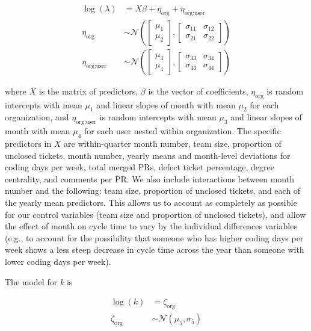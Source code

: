 \documentclass[
  sn-mathphys-ay,
]{sn-jnl}
\begin{document}
\begin{equation}
\begin{aligned}
\log(\lambda) &= X\beta + \eta_{\text{org}} + \eta_{\text{org:user}} \\
\eta_{\text{org}} &\sim \mathcal{N}\left(\begin{bmatrix} \mu_1 \\ \mu_2 \end{bmatrix}, \begin{bmatrix} \sigma_{11} & \sigma_{12} \\ \sigma_{21} & \sigma_{22} \end{bmatrix}\right) \\
\eta_{\text{org:user}} &\sim \mathcal{N}\left(\begin{bmatrix} \mu_3 \\ \mu_4 \end{bmatrix}, \begin{bmatrix} \sigma_{33} & \sigma_{34} \\ \sigma_{43} & \sigma_{44} \end{bmatrix}\right) 
\end{aligned}
\end{equation}

where \(X\) is the matrix of predictors, \(\beta\) is the vector of
coefficients, \(\eta_{\text{org}}\) is random intercepts with mean
\(\mu_1\) and linear slopes of month with mean \(\mu_2\) for each
organization, and \(\eta_{\text{org:user}}\) is random intercepts with
mean \(\mu_3\) and linear slopes of month with mean \(\mu_4\) for each
user nested within organization. The specific predictors in \(X\) are
within-quarter month number, team size, proportion of unclosed tickets,
month number, yearly means and month-level deviations for coding days
per week, total merged PRs, defect ticket percentage, degree centrality,
and comments per PR. We also include interactions between month number
and the following: team size, proportion of unclosed tickets, and each
of the yearly mean predictors. This allows us to account as completely
as possible for our control variables (team size and proportion of
unclosed tickets), and allow the effect of month on cycle time to vary
by the individual differences variables (e.g., to account for the
possibility that someone who has higher coding days per week shows a
less steep decrease in cycle time across the year than someone with
lower coding days per week).

The model for \emph{k} is

\begin{equation}
\begin{aligned}
\log(k) &= \zeta_{\text{org}} \\
\zeta_{\text{org}} &\sim \mathcal{N}(\mu_5, \sigma_{5}) 
\end{aligned}
\end{equation}
\end{document}
